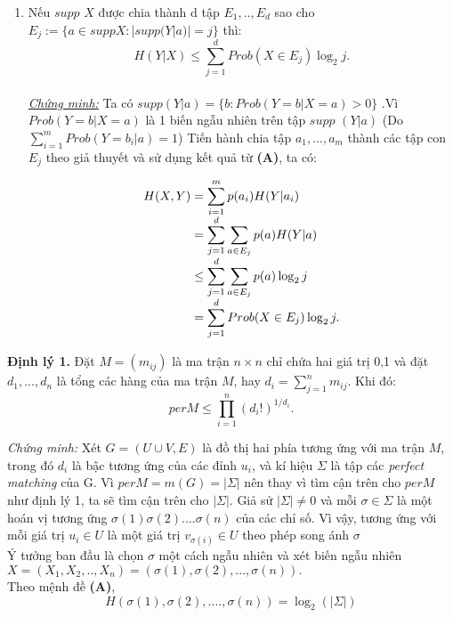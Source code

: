 \documentclass[a4paper]{report}
\begin{document}
\begin{enumerate}[label=\textbf{(\Alph*)}]
\item 
	Nếu \(supp\) \(X\) được chia thành d tập \(E_{1},..,E_{d}\) sao cho \(E_{j}:= \{a \in suppX : |supp(Y|a)| = j \} \) thì:
\begin{equation*}
    H(Y|X) \leq \sum_{j=1}^{d}Prob(X \in E_{j})\log_{2}j.
\end{equation*}
\\
\textit{\underline{Chứng minh:}} Ta có $supp(Y|a) = \{b: Prob(Y=b|X=a) > 0 \}$ .Vì $Prob(Y=b|X=a)$ là 1 biến ngẫu nhiên trên tập $supp$ $(Y|a)$ (Do $\displaystyle \sum_{i=1}^{m}Prob(Y=b_{i}|a) =1$) Tiến hành chia tập ${a_{1},...,a_{m}}$ thành các tập con $E_{j}$ theo giả thuyết và sử dụng kết quả từ \textbf{(A)}, ta có:

\begin{equation*}
\begin{array}{l@{}l}
H(X,Y)
	&{} = \displaystyle \sum_{i=1}^{m}p(a_{i})H(Y|a_{i}) \\
	&{}= \displaystyle \sum _{j=1}^{d}\sum_{a \in E_{j}}p(a)H(Y|a) \\
	&{} \leq \displaystyle \sum _{j=1}^{d}\sum_{a \in E_{j}}p(a)\log_{2}j \\
	&{} = \displaystyle \sum_{j=1}^{d}Prob(X \in E_{j})\log_{2}j.
\end{array}
\end{equation*}

\end{enumerate}





\textbf{Định lý 1.}  Đặt $M = (m_{ij})$ là ma trận $n \times n$ chỉ chứa hai giá trị 0,1 và đặt $d_{1},...,d_{n}$  là tổng các hàng của ma trận $M$, hay $d_{i} =  \displaystyle \sum _{j=1}^{n}m_{ij}$. Khi đó:
\begin{equation*}
    per M \leq \prod_{i=1}^{n}(d_{i}!)^{1/d_{i}}.
\end{equation*}

\textit{Chứng minh:} Xét $G=(U \cup V,E)$ là đồ thị hai phía tương ứng với ma trận $M$, trong đó $d_{i}$ là bậc tương ứng của các đỉnh $u_{i}$, và kí hiệu $\Sigma$ là tập các \textit{perfect matching} của G. Vì $per M=m(G) = |\Sigma|$ nên thay vì tìm cận trên cho $per M$ như định lý 1, ta sẽ tìm cận trên cho $|\Sigma|$. Giả sử $|\Sigma| \neq 0$ và mỗi $\sigma \in \Sigma$ là một hoán vị tương ứng $\sigma (1) \sigma (2) ....  \sigma (n)$ của các chỉ số. Vì vậy, tương ứng với mỗi giá trị $u_{i} \in U$ là một giá trị $v_{\sigma(i)} \in U$ theo phép song ánh $\sigma$
\\
Ý tưởng ban đầu là chọn $\sigma$ một cách ngẫu nhiên và xét biến ngẫu nhiên $X=(X_{1},X_{2},..,X_{n}) = (\sigma(1),\sigma(2),...,\sigma(n)).$
\\
Theo mệnh đề \textbf{(A)},
\begin{equation*}
H(\sigma (1), \sigma (2), ....  ,\sigma (n)) = \log_{2}(|\Sigma|)
\end{equation*}
\end{document}

